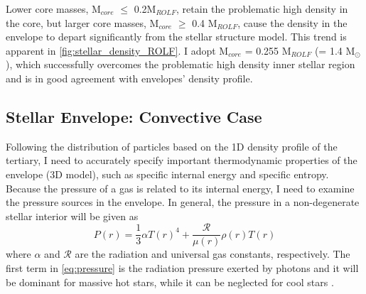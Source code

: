 Lower core masses, M$_{core}$ $\leq$ 0.2M$_{ROLF}$, retain the problematic high density in the core, but larger core masses, M$_{core}$ $\geq$ 0.4 M$_{ROLF}$, cause the density in the envelope to depart significantly from the stellar structure model. This trend is apparent in \cref{fig:stellar_density_ROLF}. I adopt M$_{core}$ = 0.255 M$_{ROLF}$ (= 1.4 M$_{\odot}$), which successfully overcomes the problematic high density inner stellar region and is in good agreement with envelopes' density profile.

\subsection{Stellar Envelope: Convective Case}\label{sub:envelope_conv}

Following the distribution of particles based on the 1D density profile of the tertiary, I need to accurately specify important thermodynamic properties of the envelope (3D model), such as specific internal energy and specific entropy. Because the pressure of a gas is related to its internal energy, I need to examine the pressure sources in the envelope. In general, the pressure in a non-degenerate stellar interior will be given as 
\begin{equation}\label{eq:pressure}
    P(r) = \frac{1}{3} \alpha T(r)^4+ \frac{\mathcal{R}}{\mu(r)} \rho(r) T(r)
\end{equation}
where $\alpha$ and $\mathcal{R}$ are the radiation and universal gas constants, respectively. The first term in \cref{eq:pressure} is the radiation pressure exerted by photons and it will be dominant for massive hot stars, while it can be neglected for cool stars \citep{pols2011stellar}.

